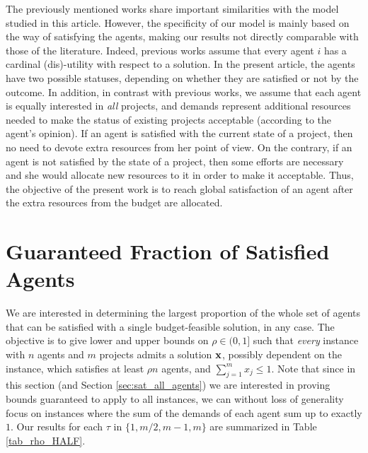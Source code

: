 \documentclass{article}
\begin{document}
The previously mentioned works share important similarities with the model studied in this article. However, the specificity of our model is mainly based on the way of satisfying the agents, making our results not directly comparable with those of the literature. Indeed, previous works assume that every agent $i$ has a cardinal (dis)-utility with respect to a solution. In the present article, the agents have two possible statuses, depending on whether they are satisfied or not by the outcome. In addition, in contrast with previous works, we assume that each agent is equally interested in \emph{all} projects, and demands represent additional resources needed to make the status of existing projects acceptable (according to the agent's opinion). If an agent is satisfied with the current state of a project, then no need to devote extra resources from her point of view. On the contrary, if an agent is not satisfied by the state of a project, then some efforts are necessary and she would allocate new resources to it in order to make it acceptable. Thus, the objective of the present work is to reach global satisfaction of an agent after the extra resources from the budget are allocated.   



\section{Guaranteed Fraction of Satisfied Agents} \label{sec:fraction}

We are interested in determining the largest proportion of the whole set of agents that can be satisfied with a single budget-feasible solution, in any case. The objective is to give lower and upper bounds on $\rho \in (0,1]$ such that \emph{every} instance with $n$ agents and $m$ projects admits a solution ${\bf x}$, possibly dependent on the instance, which satisfies at least $\rho n$ agents, and $\sum_{j=1}^m x_j \le 1$. Note that since in this section (and Section \ref{sec:sat_all_agents}) we are interested in proving bounds guaranteed to apply to all instances, we can without loss of generality focus on instances where the sum of the demands of each agent sum up to exactly $1$. Our results for each $\tau$ in $\{1,m/2,m-1,m\} $ are summarized in Table \ref{tab_rho_HALF}.



\begin{comment}
For the least demanding case ($\tau=1$) it is not difficult to satisfy all agents ($\rho=1$). For the \emph{at-least-half}  scenario ($\tau=m/2$), a constant fraction  of the agents can always be satisfied ($\frac{1}{2}+\frac{1}{2n} \leq \rho \leq  \frac{2}{3}+\frac{1}{n}$).  For large values of $\tau$ (namely $\tau \in \{m-1,m\}$), $\rho$ is of order of $1/n$.    
\end{comment}
\end{document}

